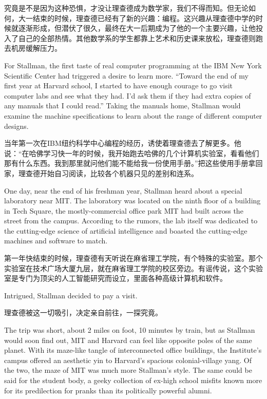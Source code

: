 \ifdefined\chs
究竟是不是因为这种恐惧，才没让理查德成为数学家，我们不得而知。但无论如何，大一结束的时候，理查德已经有了新的兴趣：编程。这兴趣从理查德中学的时候就逐渐形成，但潜伏了很久，最终在大一后期成为了他的一个主要兴趣，让他投入了自己的全部热情。其他数学系的学生都靠上艺术和历史课来放松，理查德则跑去机房缓解压力。
\fi

\ifdefined\eng
For Stallman, the first taste of real computer programming at the IBM New York Scientific Center had triggered a desire to learn more. ``Toward the end of my first year at Harvard school, I started to have enough courage to go visit computer labs and see what they had. I'd ask them if they had extra copies of any manuals that I could read.'' Taking the manuals home, Stallman would examine the machine specifications to learn about the range of different computer designs.
\fi

\ifdefined\chs
当年第一次在IBM纽约科学中心编程的经历，诱使着理查德去了解更多。他说：“在哈佛学习快一年的时候，我开始跑去哈佛的几个计算机实验室，看看他们那有什么东西。我到那里就问他们能不能给我一份使用手册。”把这些使用手册拿回家，理查德开始自习阅读，比较各个机器只见的差别和连系。
\fi

\ifdefined\eng
One day, near the end of his freshman year, Stallman heard about a special laboratory near MIT. The laboratory was located on the ninth floor of a building in Tech Square, the mostly-commercial office park MIT had built across the street from the campus. According to the rumors, the lab itself was dedicated to the cutting-edge science of artificial intelligence and boasted the cutting-edge machines and software to match.
\fi

\ifdefined\chs
第一年快结束的时候，理查德有天听说在麻省理工学院，有个特殊的实验室。那个实验室在技术广场大厦九层，就在麻省理工学院的校区旁边。有谣传说，这个实验室是专门为顶尖的人工智能研究而设立，里面各种高级计算机和软件。
\fi

\ifdefined\eng
Intrigued, Stallman decided to pay a visit.
\fi

\ifdefined\chs
理查德被这一切吸引，决定亲自前往，一探究竟。
\fi

\ifdefined\eng
The trip was short, about 2 miles on foot, 10 minutes by train, but as Stallman would soon find out, MIT and Harvard can feel like opposite poles of the same planet. With its maze-like tangle of interconnected office buildings, the Institute's campus offered an aesthetic yin to Harvard's spacious colonial-village yang.  Of the two, the maze of MIT was much more Stallman's style. The same could be said for the student body, a geeky collection of ex-high school misfits known more for its predilection for pranks than its politically powerful alumni.
\fi

